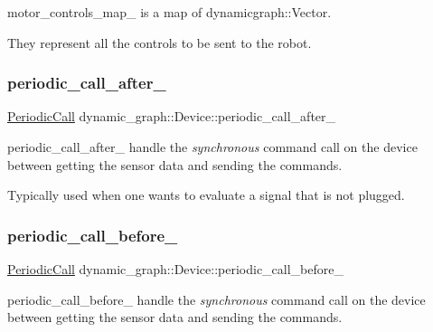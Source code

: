 motor\+\_\+controls\+\_\+map\+\_\+ is a map of dynamicgraph\+::\+Vector. 

They represent all the controls to be sent to the robot. \mbox{\label{classdynamic__graph_1_1Device_aa2ff18a40858856c9be43b2d609d63ab}} 
\subsubsection{\texorpdfstring{periodic\+\_\+call\+\_\+after\+\_\+}{periodic\_call\_after\_}}
{\footnotesize\ttfamily \hyperlink{classdynamic__graph_1_1PeriodicCall}{Periodic\+Call} dynamic\+\_\+graph\+::\+Device\+::periodic\+\_\+call\+\_\+after\+\_\+\hspace{0.3cm}{\ttfamily [protected]}}



periodic\+\_\+call\+\_\+after\+\_\+ handle the {\itshape synchronous} command call on the device between getting the sensor data and sending the commands. 

Typically used when one wants to evaluate a signal that is not plugged. \mbox{\label{classdynamic__graph_1_1Device_afe6456e2d14701498bde6ed74fb0526a}} 
\subsubsection{\texorpdfstring{periodic\+\_\+call\+\_\+before\+\_\+}{periodic\_call\_before\_}}
{\footnotesize\ttfamily \hyperlink{classdynamic__graph_1_1PeriodicCall}{Periodic\+Call} dynamic\+\_\+graph\+::\+Device\+::periodic\+\_\+call\+\_\+before\+\_\+\hspace{0.3cm}{\ttfamily [protected]}}



periodic\+\_\+call\+\_\+before\+\_\+ handle the {\itshape synchronous} command call on the device between getting the sensor data and sending the commands. 

